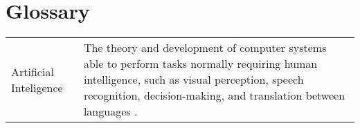 
\section*{Glossary} \label{sec:glossary}

\begin{table}[!h]

\begin{tabular}{p{2in} p{3.4in}}
Artificial Inteligence & The theory and development of computer systems able to perform tasks normally requiring human intelligence, such as visual perception, speech recognition, decision-making, and translation between languages \autocite{Oxford2014}.
\end{tabular}


\end{table}